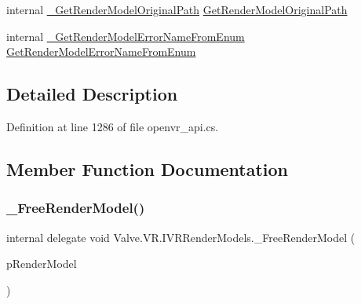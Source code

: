 \begin{DoxyCompactItemize}
\item 
internal \mbox{\hyperlink{struct_valve_1_1_v_r_1_1_i_v_r_render_models_a894340b0300b94e37c1080e084555301}{\+\_\+\+Get\+Render\+Model\+Original\+Path}} \mbox{\hyperlink{struct_valve_1_1_v_r_1_1_i_v_r_render_models_a55e005c3f3137031d618b3120591fd84}{Get\+Render\+Model\+Original\+Path}}
\item 
internal \mbox{\hyperlink{struct_valve_1_1_v_r_1_1_i_v_r_render_models_afbb07d42a16772bf58407406e41e9aac}{\+\_\+\+Get\+Render\+Model\+Error\+Name\+From\+Enum}} \mbox{\hyperlink{struct_valve_1_1_v_r_1_1_i_v_r_render_models_aa01437af440f55c1e94754fd35c78cf5}{Get\+Render\+Model\+Error\+Name\+From\+Enum}}
\end{DoxyCompactItemize}


\subsection{Detailed Description}


Definition at line 1286 of file openvr\+\_\+api.\+cs.



\subsection{Member Function Documentation}
\mbox{\label{struct_valve_1_1_v_r_1_1_i_v_r_render_models_a4fa1104771d8555a178db0ff8c817849}} 
\subsubsection{\texorpdfstring{\_FreeRenderModel()}{\_FreeRenderModel()}}
{\footnotesize\ttfamily internal delegate void Valve.\+V\+R.\+I\+V\+R\+Render\+Models.\+\_\+\+Free\+Render\+Model (\begin{DoxyParamCaption}\item[{Int\+Ptr}]{p\+Render\+Model }\end{DoxyParamCaption})}

\mbox{\label{struct_valve_1_1_v_r_1_1_i_v_r_render_models_ac4a47c1b699bbc29965d6ebd54895fe0}} 
